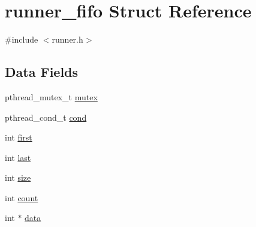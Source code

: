 \hypertarget{structrunner__fifo}{\section{runner\-\_\-fifo Struct Reference}
\label{structrunner__fifo}
}


{\ttfamily \#include $<$runner.\-h$>$}

\subsection*{Data Fields}
\begin{DoxyCompactItemize}
\item 
pthread\-\_\-mutex\-\_\-t \hyperlink{structrunner__fifo_a4acff8232e4aec9cd5c6dc200ac55ef3}{mutex}
\item 
pthread\-\_\-cond\-\_\-t \hyperlink{structrunner__fifo_a0a1433271fddfed84bc959ae6c202e5a}{cond}
\item 
int \hyperlink{structrunner__fifo_a6c8ec3c3e77241328358d43697f6f840}{first}
\item 
int \hyperlink{structrunner__fifo_a72e27dee31b1c4c6a504fbed29542d97}{last}
\item 
int \hyperlink{structrunner__fifo_a439227feff9d7f55384e8780cfc2eb82}{size}
\item 
int \hyperlink{structrunner__fifo_ad43c3812e6d13e0518d9f8b8f463ffcf}{count}
\item 
int $\ast$ \hyperlink{structrunner__fifo_ac103627c1ad15cbec2f22d0abe6d54b6}{data}
\end{DoxyCompactItemize}


